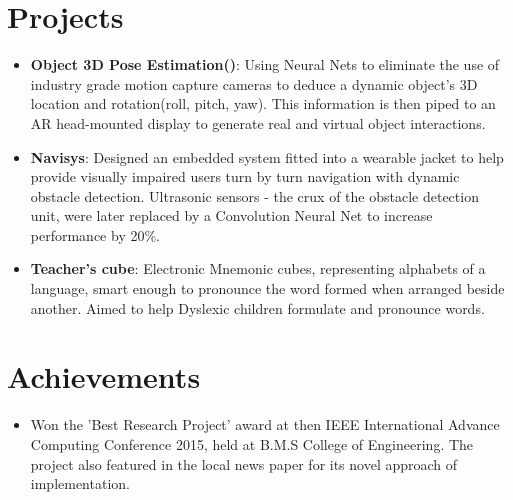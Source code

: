 \documentclass[letterpaper,11pt]{article}
\newcommand{\resumeItem}[2]{
  \item\small{
    \textbf{#1}{: #2 \vspace{-2pt}}
  }
}
\newcommand{\resumePoint}[1]{
  \item\small{#1}
}
\newcommand{\resumeSubItem}[2]{\resumeItem{#1}{#2}\vspace{-4pt}}
\newcommand{\resumeSubHeadingListStart}{\begin{itemize}[leftmargin=*]}
\newcommand{\resumeSubHeadingListEnd}{\end{itemize}\vspace{-10pt}}
\begin{document}
\section{Projects}
  \resumeSubHeadingListStart
    \resumeSubItem{Object 3D Pose Estimation()}
      {Using Neural Nets to eliminate the use of industry grade motion capture cameras to deduce a dynamic object\rq s 3D location and rotation(roll, pitch, yaw). This information is then piped to an AR head-mounted display to generate real and virtual object interactions.}
    \resumeSubItem{Navisys}
      {Designed an embedded system fitted into a wearable jacket to help provide visually impaired users turn by turn navigation with dynamic obstacle detection. Ultrasonic sensors - the crux of the obstacle detection unit, were later replaced by a Convolution Neural Net to increase performance by 20\%.}
    \resumeSubItem{Teacher\rq s cube}
      {Electronic Mnemonic cubes, representing alphabets of a language, smart enough to pronounce the word formed when arranged  beside another. Aimed to help Dyslexic children formulate and pronounce words.}
    \resumeSubHeadingListEnd

\section{Achievements}
  \resumeSubHeadingListStart
    \resumePoint{Won the 'Best Research Project' award at then IEEE International Advance Computing Conference 2015, held at B.M.S College of Engineering. The project also featured in the local news paper for its novel approach of implementation.}
  \resumeSubHeadingListEnd
\end{document}
